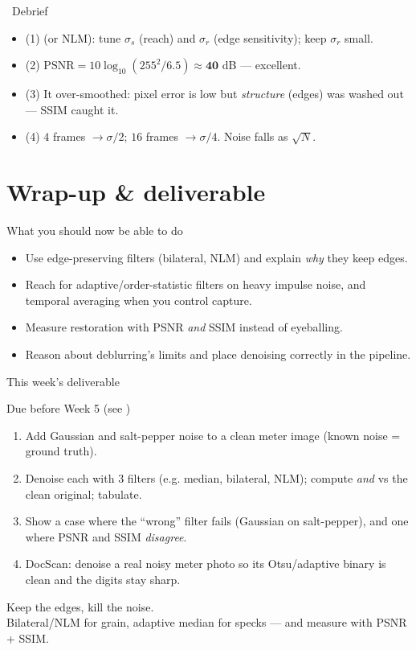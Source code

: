 \documentclass[10pt,aspectratio=169]{beamer}
\begin{document}
\begin{frame}{\faPen~Debrief}
  \begin{itemize}
    \item (1)  (or NLM): tune $\sigma_s$ (reach) and $\sigma_r$ (edge sensitivity); keep $\sigma_r$ small.
    \item (2) $\mathrm{PSNR}=10\log_{10}(255^2/6.5)\approx\mathbf{40}$ dB — excellent.
    \item (3) It over-smoothed: pixel error is low but \emph{structure} (edges) was washed out — SSIM caught it.
    \item (4) $4$ frames $\rightarrow \sigma/2$; $16$ frames $\rightarrow \sigma/4$. Noise falls as $\sqrt{N}$.
  \end{itemize}
\end{frame}

\section{Wrap-up \& deliverable}

\begin{frame}{What you should now be able to do}
  \begin{itemize}
    \item Use edge-preserving filters (bilateral, NLM) and explain \emph{why} they keep edges.
    \item Reach for adaptive/order-statistic filters on heavy impulse noise, and temporal averaging when you control capture.
    \item Measure restoration with PSNR \emph{and} SSIM instead of eyeballing.
    \item Reason about deblurring's limits and place denoising correctly in the pipeline.
  \end{itemize}
\end{frame}

\begin{frame}{This week's deliverable}
  \begin{alertblock}{Due before Week 5 (see )}
    \begin{enumerate}
      \item Add Gaussian and salt-pepper noise to a clean meter image (known noise = ground truth).
      \item Denoise each with 3 filters (e.g. median, bilateral, NLM); compute  \emph{and}  vs the clean original; tabulate.
      \item Show a case where the ``wrong'' filter fails (Gaussian on salt-pepper), and one where PSNR and SSIM \emph{disagree}.
      \item DocScan: denoise a real noisy meter photo so its Otsu/adaptive binary is clean and the digits stay sharp.
    \end{enumerate}
  \end{alertblock}
\end{frame}

\begin{frame}[standout]
  Keep the edges, kill the noise.\\[4pt]
  \normalsize Bilateral/NLM for grain, adaptive median for specks — and measure with PSNR + SSIM.
\end{frame}
\end{document}
